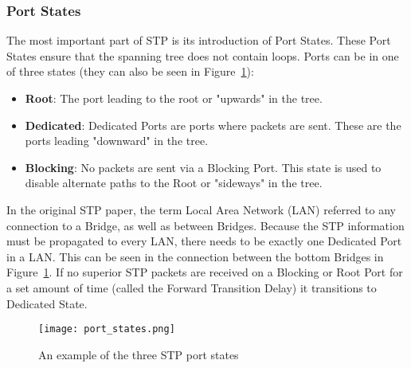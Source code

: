 \subsubsection{Port States}
The most important part of STP is its introduction of Port States.
These Port States ensure that the spanning tree does not contain loops.
Ports can be in one of three states (they can also be seen in Figure~\ref{fig:port_states}):
\begin{itemize}
    \item \textbf{Root}: The port leading to the root or "upwards" in the tree.
    \item \textbf{Dedicated}: Dedicated Ports are ports where packets are sent. These are the ports leading "downward" in the tree.
    \item \textbf{Blocking}: No packets are sent via a Blocking Port.
        This state is used to disable alternate paths to the Root or "sideways" in the tree.
\end{itemize}
In the original STP paper, the term Local Area Network (LAN) referred to any connection to a Bridge, as well as between Bridges.
Because the STP information must be propagated to every LAN, there needs to be exactly one Dedicated Port in a LAN.
This can be seen in the connection between the bottom Bridges in Figure~\ref{fig:port_states}.
If no superior STP packets are received on a Blocking or Root Port for a set amount of time (called the Forward Transition Delay) it transitions to Dedicated State.
\begin{figure}
    \centering
    \texttt{[image: port\_states.png]}
    \caption{An example of the three STP port states}
    \label{fig:port_states}
\end{figure}

